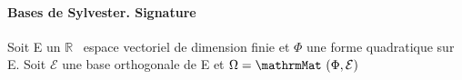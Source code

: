 \paragraph{Bases de Sylvester. Signature}
%
Soit E un $\mathbb{R}$~ espace vectoriel de dimension finie et $\Phi$ une forme
quadratique sur E. Soit $\mathcal{E}$ une base orthogonale de E et $\Omega
= \mathrmMat~ (\Phi,\mathcal{E})$
%
%
%
%
